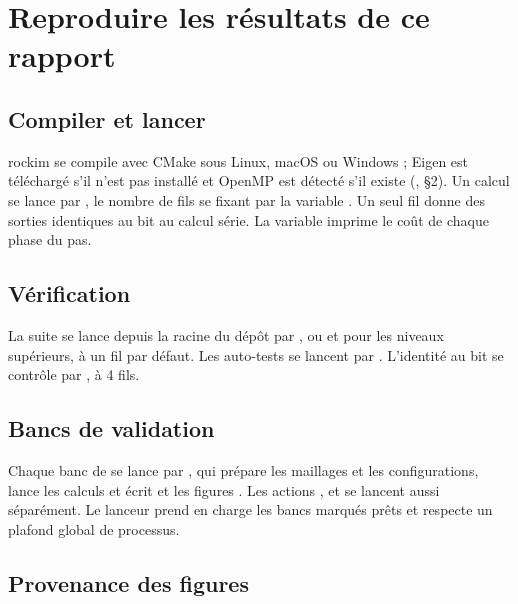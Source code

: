 \section{Reproduire les résultats de ce rapport}
\label{sec-annexe-reproduire}

\subsection{Compiler et lancer}

rockim se compile avec CMake sous Linux, macOS ou Windows ; Eigen est téléchargé s'il n'est pas installé et OpenMP est détecté s'il existe (, §2). Un calcul se lance par , le nombre de fils se fixant par la variable . Un seul fil donne des sorties identiques au bit au calcul série. La variable  imprime le coût de chaque phase du pas.

\subsection{Vérification}

La suite se lance depuis la racine du dépôt par , ou  et  pour les niveaux supérieurs, à un fil par défaut. Les auto-tests se lancent par . L'identité au bit se contrôle par , à 4 fils.

\subsection{Bancs de validation}

Chaque banc de  se lance par , qui prépare les maillages et les configurations, lance les calculs et écrit  et les figures . Les actions ,  et  se lancent aussi séparément. Le lanceur  prend en charge les bancs marqués prêts et respecte un plafond global de processus.

\subsection{Provenance des figures}

